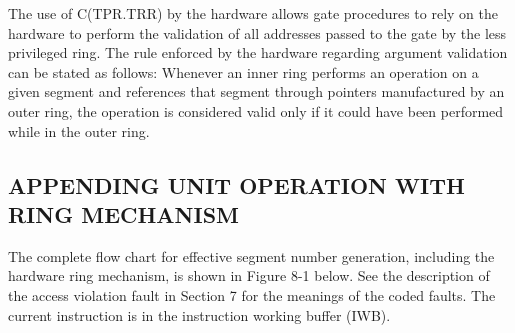 The use of C(TPR.TRR) by the hardware allows gate procedures to rely on the
hardware to perform the validation of all addresses passed to the gate by the
less privileged ring. The rule enforced by the hardware regarding argument
validation can be stated as follows: Whenever an inner ring performs an
operation on a given segment and references that segment through pointers
manufactured by an outer ring, the operation is considered valid only if it
could have been performed while in the outer ring.


\subsection{APPENDING UNIT OPERATION WITH RING MECHANISM}

The complete flow chart for effective segment number generation, including the
hardware ring mechanism, is shown in Figure 8-1 below. See the description of
the access violation fault in Section 7 for the meanings of the coded faults.
The current instruction is in the instruction working buffer (IWB).


